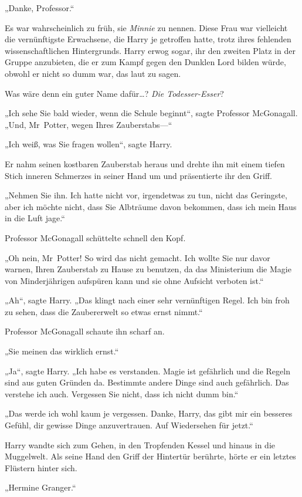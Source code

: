 {„Danke, Professor.“

Es war wahrscheinlich zu früh, sie \emph{Minnie} zu nennen. Diese Frau war vielleicht die vernünftigste Erwachsene, die Harry je getroffen hatte, trotz ihres fehlenden wissenschaftlichen Hintergrunds. Harry erwog sogar, ihr den zweiten Platz in der Gruppe anzubieten, die er zum Kampf gegen den Dunklen Lord bilden würde, obwohl er nicht so dumm war, das laut zu sagen.

Was wäre denn ein guter Name dafür…? \emph{Die Todesser-Esser}?

„Ich sehe Sie bald wieder, wenn die Schule beginnt“, sagte Professor McGonagall. „Und, Mr~Potter, wegen Ihres Zauberstabs—“

„Ich weiß, was Sie fragen wollen“, sagte Harry.

Er nahm seinen kostbaren Zauberstab heraus und drehte ihn mit einem tiefen Stich inneren Schmerzes in seiner Hand um und präsentierte ihr den Griff.

„Nehmen Sie ihn. Ich hatte nicht vor, irgendetwas zu tun, nicht das Geringste, aber ich möchte nicht, dass Sie Albträume davon bekommen, dass ich mein Haus in die Luft jage.“

Professor McGonagall schüttelte schnell den Kopf.

„Oh nein, Mr~Potter! So wird das nicht gemacht. Ich wollte Sie nur davor warnen, Ihren Zauberstab zu Hause zu benutzen, da das Ministerium die Magie von Minderjährigen aufspüren kann und sie ohne Aufsicht verboten ist.“

„Ah“, sagte Harry. „Das klingt nach einer sehr vernünftigen Regel. Ich bin froh zu sehen, dass die Zaubererwelt so etwas ernst nimmt.“

Professor McGonagall schaute ihn scharf an.

„Sie meinen das wirklich ernst.“

„Ja“, sagte Harry. „Ich habe es verstanden. Magie ist gefährlich und die Regeln sind aus guten Gründen da. Bestimmte andere Dinge sind auch gefährlich. Das verstehe ich auch. Vergessen Sie nicht, dass ich nicht dumm bin.“

„Das werde ich wohl kaum je vergessen. Danke, Harry, das gibt mir ein besseres Gefühl, dir gewisse Dinge anzuvertrauen. Auf Wiedersehen für jetzt.“

Harry wandte sich zum Gehen, in den Tropfenden Kessel und hinaus in die Muggelwelt. Als seine Hand den Griff der Hintertür berührte, hörte er ein letztes Flüstern hinter sich.

„Hermine Granger.“

}

